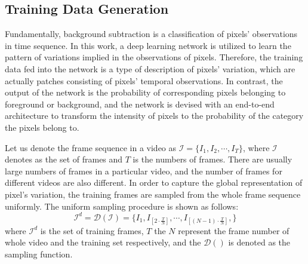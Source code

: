 \documentclass[journal]{IEEEtran}
\begin{document}
\subsection*{Training Data Generation}
Fundamentally, 
background subtraction is a classification of pixels' observations in time sequence.
In this work,
a deep learning network is utilized to learn the pattern of variations implied in the observations of pixels.
Therefore,
the training data fed into the network is a type of description of pixels' variation,
which are actually patches consisting of pixels' temporal observations.
%
In contrast, the output of the network is the probability of corresponding pixels belonging to foreground or background,
and the network is devised with an end-to-end architecture to transform the intensity of pixels to the probability of the category the pixels belong to.

Let us denote the frame sequence in a video as $\mathcal{I} = \{I_1, I_2, \cdots, I_T\}$,
where $\mathcal{I}$ denotes as the set of frames and $T$ is the numbers of frames.
%
There are usually large numbers of frames in a particular video,
and the number of frames for different videos are also different.
%
In order to capture the global representation of pixel's variation,
the training frames are sampled from the whole frame sequence uniformly.
%
%
The uniform sampling procedure is shown as follows:
% 
% 
\begin{equation}
    \mathcal{I}^d = \mathcal{D}(\mathcal{I})=  \{I_1, I_{[2 \cdot \frac{T}{N}]}, \cdots, I_{[(N - 1) \cdot \frac{T}{N}]}, \}
\end{equation}
where $\mathcal{I}^d$ is the set of training frames,
$T$ the $N$ represent the frame number of whole video and the training set respectively,
and the $\mathcal{D}()$ is denoted as the sampling function.
% 
% 
% 
% 
% 
\end{document}
